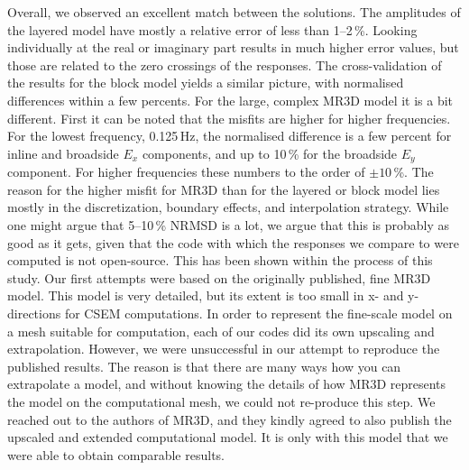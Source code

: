 \documentclass[extra, camera,%
]{gji}
\newcommand{\itodo}[1]{\todo[color=blue!40!white, inline]{\sffamily #1}}
\begin{document}
\itodo{Adjust/check text for amplitude/phase plots.}
Overall, we observed an excellent match between the solutions. The amplitudes of the layered model have mostly a relative error of less than 1--2\,\%. Looking individually at the real or imaginary part results in much higher error values, but those are related to the zero crossings of the responses. The cross-validation of the results for the block model yields a similar picture, with normalised differences within a few percents. For the large, complex MR3D model it is a bit different. First it can be noted that the misfits are higher for higher frequencies. For the lowest frequency, 0.125\,Hz, the normalised difference is a few percent for inline and broadside $E_x$ components, and up to 10\,\% for the broadside $E_y$ component. For higher frequencies these numbers  to the order of $\pm10\,$\%. The reason for the higher misfit for MR3D than for the layered or block model lies mostly in the discretization, boundary effects, and interpolation strategy. While one might argue that 5--10\,\% NRMSD is a lot, we argue that this is probably as good as it gets, given that the code with which the responses we compare to were computed is not open-source. This has been shown within the process of this study. Our first attempts were based on the originally published, fine MR3D model. This model is very detailed, but its extent is too small in  x- and y-directions for CSEM computations. In order to represent the fine-scale model on a mesh suitable for computation, each of our codes did its own upscaling and extrapolation. However, we were unsuccessful in our attempt to reproduce the published results.  The reason is that there are many ways how you can extrapolate a model, and without knowing the details of how MR3D represents the model on the computational mesh, we could not re-produce this step. We reached out to the authors of MR3D, and they kindly agreed to also publish the upscaled and extended computational model. It is only with this model that we were able to obtain comparable results.
\end{document}
